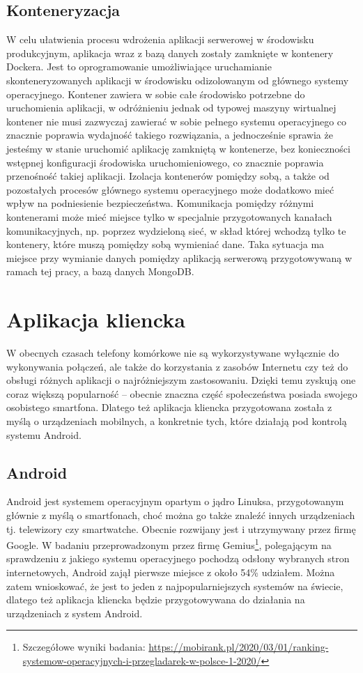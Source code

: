 \documentclass[a4paper,12pt,twoside,openany]{report}
\begin{document}
\subsection{Konteneryzacja}
W celu ułatwienia procesu wdrożenia aplikacji serwerowej w środowisku produkcyjnym, aplikacja wraz z bazą danych zostały zamknięte w kontenery Dockera. Jest to oprogramowanie  umożliwiające uruchamianie skonteneryzowanych aplikacji w środowisku odizolowanym od głównego systemy operacyjnego. Kontener zawiera w sobie całe środowisko potrzebne do uruchomienia aplikacji, w odróżnieniu jednak od typowej maszyny wirtualnej kontener nie musi zazwyczaj zawierać w sobie pełnego systemu operacyjnego co znacznie poprawia wydajność takiego rozwiązania, a jednocześnie sprawia że jesteśmy w stanie uruchomić aplikację zamkniętą w kontenerze, bez konieczności wstępnej konfiguracji środowiska uruchomieniowego, co znacznie poprawia przenośność takiej aplikacji. Izolacja kontenerów pomiędzy sobą, a także od pozostałych procesów głównego systemu operacyjnego może dodatkowo mieć wpływ na podniesienie bezpieczeństwa. Komunikacja pomiędzy różnymi kontenerami może mieć miejsce tylko w specjalnie przygotowanych kanałach komunikacyjnych, np. poprzez wydzieloną sieć, w skład której wchodzą tylko te kontenery, które muszą pomiędzy sobą wymieniać dane. Taka sytuacja ma miejsce przy wymianie danych pomiędzy aplikacją serwerową przygotowywaną w ramach tej pracy, a bazą danych MongoDB.


\section{Aplikacja kliencka}
W obecnych czasach telefony komórkowe nie są wykorzystywane wyłącznie do wykonywania połączeń, ale także do korzystania z zasobów Internetu czy też do obsługi różnych aplikacji o najróżniejszym zastosowaniu. Dzięki temu zyskują one coraz większą popularność -- obecnie znaczna część społeczeństwa posiada swojego osobistego smartfona. Dlatego też aplikacja kliencka przygotowana została z myślą o urządzeniach mobilnych, a konkretnie tych, które działają pod kontrolą systemu Android. 

\subsection{Android}
Android jest systemem operacyjnym opartym o jądro Linuksa, przygotowanym głównie z myślą o smartfonach, choć można go także znaleźć innych urządzeniach tj. telewizory czy smartwatche. Obecnie rozwijany jest i utrzymywany przez firmę Google. W badaniu przeprowadzonym przez firmę Gemius\footnote{ Szczegółowe wyniki badania: \url{https://mobirank.pl/2020/03/01/ranking-systemow-operacyjnych-i-przegladarek-w-polsce-1-2020/}}, polegającym na sprawdzeniu z jakiego systemu operacyjnego pochodzą odsłony wybranych stron internetowych, Android zajął pierwsze miejsce z około 54\% udziałem. Można zatem wnioskować, że jest to jeden z najpopularniejszych systemów na świecie, dlatego też aplikacja kliencka będzie przygotowywana do działania na urządzeniach z system Android. 
 
\end{document}
